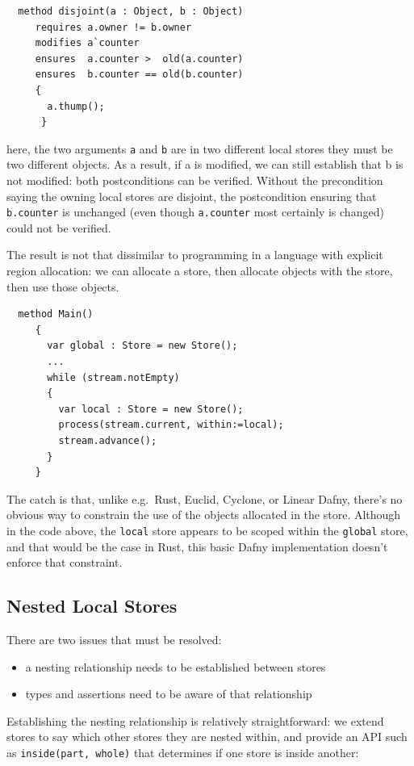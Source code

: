 \begin{lstlisting}
  method disjoint(a : Object, b : Object)
     requires a.owner != b.owner
     modifies a`counter
     ensures  a.counter >  old(a.counter)
     ensures  b.counter == old(b.counter)
     {
       a.thump();
      }
\end{lstlisting}

\noindent here, the two arguments \lstinline+a+ and \lstinline+b+ are
in two different local stores they must be two different objects. As a
result, if a is modified, we can still establish that b is not
modified: both postconditions can be verified.  Without the
precondition saying the owning local stores are disjoint, the
postcondition ensuring that \lstinline+b.counter+ is unchanged (even
though \lstinline+a.counter+ most certainly is changed) could not be
verified.

The result is not that dissimilar to programming in a
language with explicit region allocation: we can allocate a store,
then allocate objects with the store, then use those objects.

\begin{lstlisting}
  method Main()
     {
       var global : Store = new Store();
       ...
       while (stream.notEmpty)
       {
         var local : Store = new Store();
         process(stream.current, within:=local);
         stream.advance();
       }
     }
\end{lstlisting}

The catch is that, unlike e.g.\ Rust, Euclid, Cyclone, or Linear Dafny,
there's no obvious way to constrain the use of the objects allocated
in the store. Although in the code above, the \lstinline+local+ store
appears to be scoped within the \lstinline+global+ store, and that
would be the case in Rust, this basic Dafny implementation doesn't
enforce that constraint.

\subsection{Nested Local Stores}

There are two issues that must be resolved:
\begin{itemize}
\item a nesting relationship needs to be established between stores
\item types and assertions need to be aware of that relationship
\end{itemize}

\noindent Establishing the nesting relationship is relatively straightforward: 
we extend stores to say which other stores they are nested within,
and provide an API such as \lstinline+inside(part, whole)+ that determines
if one store is inside another:

